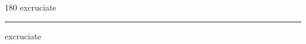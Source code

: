 
\begin{frame}
\begin{center}
\begin{turn}{180}
{\fontsize{2.5cm}{1em}\selectfont excruciate}
\end{turn}
\vspace{1em}\par  
\hrule
\vspace{1em}\par  
{\fontsize{2.5cm}{1em}\selectfont excruciate}
\end{center}
\end{frame}

